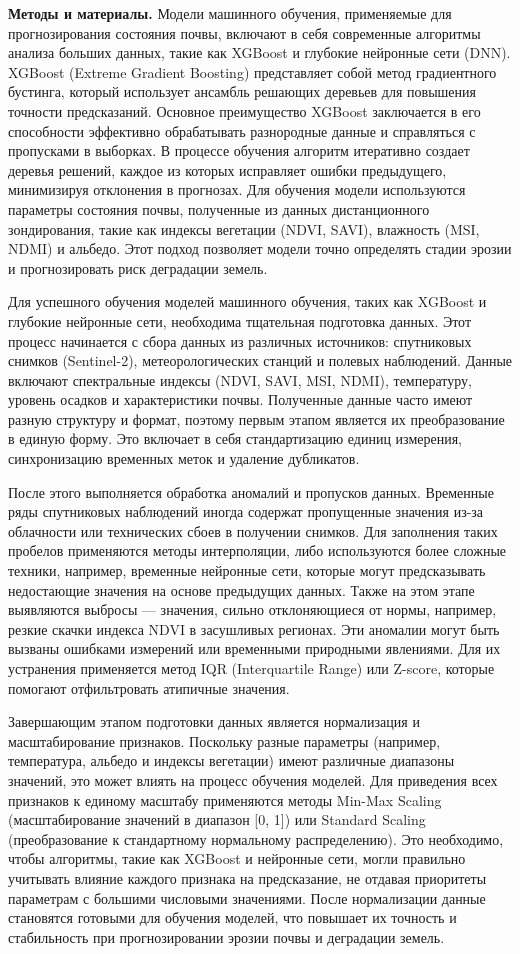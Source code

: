 \begin{multicols}{2}
{\bfseries Методы и материалы.} Модели машинного обучения, применяемые для
прогнозирования состояния почвы, включают в себя современные алгоритмы
анализа больших данных, такие как XGBoost и глубокие нейронные сети
(DNN). XGBoost (Extreme Gradient Boosting) представляет собой метод
градиентного бустинга, который использует ансамбль решающих деревьев для
повышения точности предсказаний. Основное преимущество XGBoost
заключается в его способности эффективно обрабатывать разнородные данные
и справляться с пропусками в выборках. В процессе обучения алгоритм
итеративно создает деревья решений, каждое из которых исправляет ошибки
предыдущего, минимизируя отклонения в прогнозах. Для обучения модели
используются параметры состояния почвы, полученные из данных
дистанционного зондирования, такие как индексы вегетации (NDVI, SAVI),
влажность (MSI, NDMI) и альбедо. Этот подход позволяет модели точно
определять стадии эрозии и прогнозировать риск деградации земель.

Для успешного обучения моделей машинного обучения, таких как XGBoost и
глубокие нейронные сети, необходима тщательная подготовка данных. Этот
процесс начинается с сбора данных из различных источников: спутниковых
снимков (Sentinel-2), метеорологических станций и полевых наблюдений.
Данные включают спектральные индексы (NDVI, SAVI, MSI, NDMI),
температуру, уровень осадков и характеристики почвы. Полученные данные
часто имеют разную структуру и формат, поэтому первым этапом является их
преобразование в единую форму. Это включает в себя стандартизацию единиц
измерения, синхронизацию временных меток и удаление дубликатов.

После этого выполняется обработка аномалий и пропусков данных. Временные
ряды спутниковых наблюдений иногда содержат пропущенные значения из-за
облачности или технических сбоев в получении снимков. Для заполнения
таких пробелов применяются методы интерполяции, либо используются более
сложные техники, например, временные нейронные сети, которые могут
предсказывать недостающие значения на основе предыдущих данных. Также на
этом этапе выявляются выбросы --- значения, сильно отклоняющиеся от
нормы, например, резкие скачки индекса NDVI в засушливых регионах. Эти
аномалии могут быть вызваны ошибками измерений или временными природными
явлениями. Для их устранения применяется метод IQR (Interquartile Range)
или Z-score, которые помогают отфильтровать атипичные значения.

Завершающим этапом подготовки данных является нормализация и
масштабирование признаков. Поскольку разные параметры (например,
температура, альбедо и индексы вегетации) имеют различные диапазоны
значений, это может влиять на процесс обучения моделей. Для приведения
всех признаков к единому масштабу применяются методы Min-Max Scaling
(масштабирование значений в диапазон {[}0, 1{]}) или Standard Scaling
(преобразование к стандартному нормальному распределению). Это
необходимо, чтобы алгоритмы, такие как XGBoost и нейронные сети, могли
правильно учитывать влияние каждого признака на предсказание, не отдавая
приоритеты параметрам с большими числовыми значениями. После
нормализации данные становятся готовыми для обучения моделей, что
повышает их точность и стабильность при прогнозировании эрозии почвы и
деградации земель.


\end{multicols}
